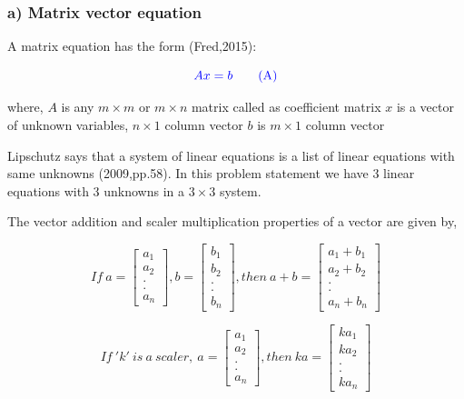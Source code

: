 \documentclass[a4paper]{report}
\begin{document}
\subsubsection*{a)  Matrix vector equation}


A matrix equation has the form (Fred,2015):

\begin{equation}
    \color{blue} Ax=b \tag{A}
\end{equation}

where,
\newline $A$ is any $m\times m$  or $m\times n$ matrix called as coefficient matrix
\newline $x$ is a vector of unknown variables, $n\times 1$ column vector
\newline $b$ is $m \times 1$ column vector

Lipschutz says that a system of linear equations is a list of linear equations with same unknowns (2009,pp.58). In this problem statement we have 3 linear equations with 3 unknowns in a $3\times 3$ system.

The vector addition and scaler multiplication properties of a vector are given by,

\begin{equation}
    If\ a= \begin{bmatrix}
        a_1\\a_2\\.\\.\\a_n
    \end{bmatrix},b= \begin{bmatrix}
        b_1\\b_2\\.\\.\\b_n
    \end{bmatrix}, then\ a+b=\begin{bmatrix}
        a_1+b_1\\a_2+b_2\\.\\.\\a_n+b_n
    \end{bmatrix}
\end{equation}

\begin{equation}
    If\ 'k' \ is\ a\ scaler,\ a = \begin{bmatrix}
        a_1\\a_2\\.\\.\\a_n
    \end{bmatrix}, then\ ka=\begin{bmatrix}
        ka_1\\ka_2\\.\\.\\ka_n
    \end{bmatrix}
\end{equation}
\end{document}
